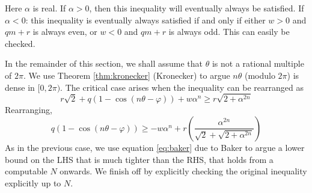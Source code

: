 Here $\alpha$ is real. If $\alpha > 0$, then this inequality will eventually always be satisfied. If $\alpha < 0$: this inequality is eventually always satisfied if and only if either $w>0$ and $qm+r$ is always even, or $w<0$ and $qm+r$ is always odd. This can easily be checked.

In the remainder of this section, we shall assume that $\theta$ is not a rational multiple of $2\pi$. We use Theorem \ref{thm:kronecker} (Kronecker) to argue $n\theta$ (modulo $2\pi$) is dense in $[0, 2\pi)$. The critical case arises when the inequality can be rearranged as
\begin{equation}
r\sqrt{2} + q(1 - \cos(n\theta - \varphi)) + w\alpha^n \ge r\sqrt{2 + \alpha^{2n}}
\end{equation}
Rearranging,
\begin{equation}
q(1 - \cos(n\theta - \varphi)) \ge -w\alpha^n + r\left(\frac{\alpha^{2n}}{\sqrt{2}+\sqrt{2 + \alpha^{2n}}}\right)
\end{equation}
As in the previous case, we use equation \ref{eq:baker} due to Baker to argue a lower bound on the LHS that is much tighter than the RHS, that holds from a computable $N$ onwards. We finish off by explicitly checking the original inequality explicitly up to $N$.

